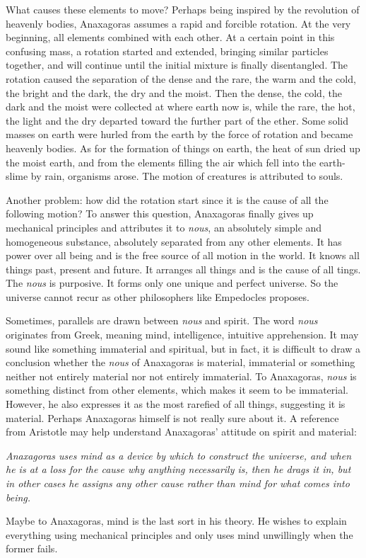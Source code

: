 \documentclass[11pt]{article}
\begin{document}
\newline

What causes these elements to move? 
Perhaps being inspired by the revolution of heavenly bodies, Anaxagoras assumes a rapid and forcible rotation. 
At the very beginning, all elements combined with each other. 
At a certain point in this confusing mass, a rotation started and extended, bringing similar particles together, and will continue until the initial mixture is finally disentangled. 
The rotation caused the separation of the dense and the rare, the warm and the cold, the bright and the dark, the dry and the moist. 
Then the dense, the cold, the dark and the moist were collected at where earth now is, while the rare, the hot, the light and the dry departed toward the further part of the ether. 
Some solid masses on earth were hurled from the earth by the force of rotation and became heavenly bodies. 
As for the formation of things on earth, the heat of sun dried up the moist earth, and from the elements filling the air which fell into the earth-slime by rain, organisms arose. 
The motion of creatures is attributed to souls.

\newline

Another problem: how did the rotation start since it is the cause of all the following motion? 
To answer this question, Anaxagoras finally gives up mechanical principles and attributes it to \textit{nous}, an absolutely simple and homogeneous substance, absolutely separated from any other elements. 
It has power over all being and is the free source of all motion in the world. 
It knows all things past, present and future. 
It arranges all things and is the cause of all tings. 
The \textit{nous} is purposive. 
It forms only one unique and perfect universe. 
So the universe cannot recur as other philosophers like Empedocles proposes. 

\newline

Sometimes, parallels are drawn between \textit{nous} and spirit. 
The word \textit{nous} originates from Greek, meaning mind, intelligence, intuitive apprehension. 
It may sound like something immaterial and spiritual, but in fact, it is difficult to draw a conclusion whether the \textit{nous} of Anaxagoras is material, immaterial or something neither not entirely material nor not entirely immaterial. 
To Anaxagoras, \textit{nous} is something distinct from other elements, which makes it seem to be immaterial. 
However, he also expresses it as the most rarefied of all things, suggesting it is material. 
Perhaps Anaxagoras himself is not really sure about it. 
A reference from Aristotle may help understand Anaxagoras’ attitude on spirit and material: 
  
\textit{Anaxagoras uses mind as a device by which to construct the universe, and when he is at a loss for the cause why anything necessarily is, then he drags it in, but in other cases he assigns any other cause rather than mind for what comes into being.}

Maybe to Anaxagoras, mind is the last sort in his theory. 
He wishes to explain everything using mechanical principles and only uses mind unwillingly when the former fails. 
  
\end{document}

